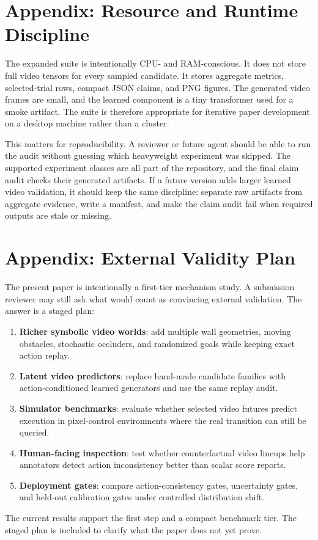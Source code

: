 \documentclass{article}
\begin{document}
\section{Appendix: Resource and Runtime Discipline}
\label{app:resources}

The expanded suite is intentionally CPU- and RAM-conscious. It does not store full video tensors for every sampled candidate. It stores aggregate metrics, selected-trial rows, compact JSON claims, and PNG figures. The generated video frames are small, and the learned component is a tiny transformer used for a smoke artifact. The suite is therefore appropriate for iterative paper development on a desktop machine rather than a cluster.

This matters for reproducibility. A reviewer or future agent should be able to run the audit without guessing which heavyweight experiment was skipped. The supported experiment classes are all part of the repository, and the final claim audit checks their generated artifacts. If a future version adds larger learned video validation, it should keep the same discipline: separate raw artifacts from aggregate evidence, write a manifest, and make the claim audit fail when required outputs are stale or missing.

\section{Appendix: External Validity Plan}
\label{app:external-plan}

The present paper is intentionally a first-tier mechanism study. A submission reviewer may still ask what would count as convincing external validation. The answer is a staged plan:
\begin{enumerate}
  \item \textbf{Richer symbolic video worlds}: add multiple wall geometries, moving obstacles, stochastic occluders, and randomized goals while keeping exact action replay.
  \item \textbf{Latent video predictors}: replace hand-made candidate families with action-conditioned learned generators and use the same replay audit.
  \item \textbf{Simulator benchmarks}: evaluate whether selected video futures predict execution in pixel-control environments where the real transition can still be queried.
  \item \textbf{Human-facing inspection}: test whether counterfactual video lineups help annotators detect action inconsistency better than scalar score reports.
  \item \textbf{Deployment gates}: compare action-consistency gates, uncertainty gates, and held-out calibration gates under controlled distribution shift.
\end{enumerate}
The current results support the first step and a compact benchmark tier. The staged plan is included to clarify what the paper does not yet prove.
\end{document}
